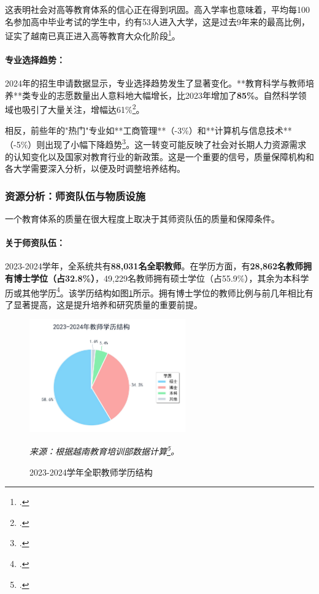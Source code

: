 这表明社会对高等教育体系的信心正在得到巩固。高入学率也意味着，平均每100名参加高中毕业考试的学生中，约有53人进入大学，这是过去9年来的最高比例，证实了越南已真正进入高等教育大众化阶段\footcite{stat_ty_le_vao_dh_2023}。

\paragraph{专业选择趋势：}
2024年的招生申请数据显示，专业选择趋势发生了显著变化。**教育科学与教师培养**类专业的志愿数量出人意料地大幅增长，比2023年增加了\textbf{85\%}。自然科学领域也吸引了大量关注，增幅达61\%\footcite{stat_tuyen_sinh_2024_so_lieu}。

相反，前些年的"热门"专业如**工商管理**（-3\%）和**计算机与信息技术**（-5\%）则出现了小幅下降趋势\footcite{stat_tuyen_sinh_2024_so_lieu}。这一转变可能反映了社会对长期人力资源需求的认知变化以及国家对教育行业的新政策。这是一个重要的信号，质量保障机构和各大学需要深入分析，以便及时调整培养结构。

\subsubsection{资源分析：师资队伍与物质设施}

一个教育体系的质量在很大程度上取决于其师资队伍的质量和保障条件。

\paragraph{关于师资队伍：}
2023-2024学年，全系统共有\textbf{88,031名全职教师}。在学历方面，有\textbf{28,862名教师拥有博士学位（占32.8\%）}，49,229名教师拥有硕士学位（占55.9\%），其余为本科学历或其他学历\footcite{stat_moet_2024}。该学历结构如图\ref{fig:co_cau_giang_vien}所示。拥有博士学位的教师比例与前几年相比有了显著提高，这是提升培养和研究质量的重要前提。


\begin{figure}[h!]
    \centering
    \includegraphics[width=0.6\textwidth]{image/co_cau_trinh_do_giang_vien_2023_2024.jpg}
    \caption{2023-2024学年全职教师学历结构}
    \label{fig:co_cau_giang_vien}
    \vspace{0.2cm}
    \footnotesize{\textit{来源：根据越南教育培训部数据计算\footcite{stat_moet_2024}。}}
\end{figure}

